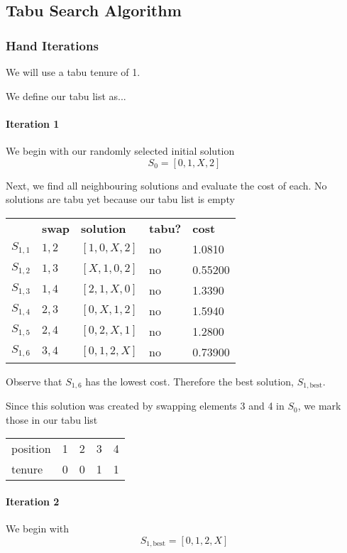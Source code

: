 \documentclass[a4paper]{article}
\newcommand{\subsubsubsection}[1]{\paragraph{#1} \mbox{}}
\begin{document}
\subsection{Tabu Search Algorithm} %

\subsubsection{Hand Iterations}

We will use a tabu tenure of 1.

We define our tabu list as...

\subsubsubsection{Iteration 1}

We begin with our randomly selected initial solution
$$S_0 = [ 0, 1, X, 2 ]$$

Next, we find all neighbouring solutions and evaluate the cost of each. No solutions are tabu yet because our tabu list is empty

\begin{tabular}{lllll}
& \textbf{swap}   & \textbf{solution}    & \textbf{tabu?} & \textbf{cost}  \\

$S_{1,1}$ & $1,2$ & $[1, 0, X, 2]$ & no & 1.0810   \\
$S_{1,2}$ & $1,3$ & $[X, 1, 0, 2]$ & no & 0.55200  \\
$S_{1,3}$ & $1,4$ & $[2, 1, X, 0]$ & no & 1.3390   \\
$S_{1,4}$ & $2,3$ & $[0, X, 1, 2]$ & no & 1.5940   \\
$S_{1,5}$ & $2,4$ & $[0, 2, X, 1]$ & no & 1.2800   \\
$S_{1,6}$ & $3,4$ & $[0, 1, 2, X]$ & no & 0.73900  \\
\end{tabular}

Observe that $S_{1,6}$ has the lowest cost. Therefore the best solution, $S_{1, \text{best}}$.

Since this solution was created by swapping elements 3 and 4 in $S_0$, we mark those in our tabu list

\begin{tabular}{lllll}
position & 1 & 2 & 3 & 4 \\
tenure   & 0 & 0 & 1 & 1
\end{tabular}
\vspace{1.5em}

\subsubsubsection{Iteration 2}

We begin with $$S_{1, \text{best}} = [0, 1, 2, X]$$
\end{document}
